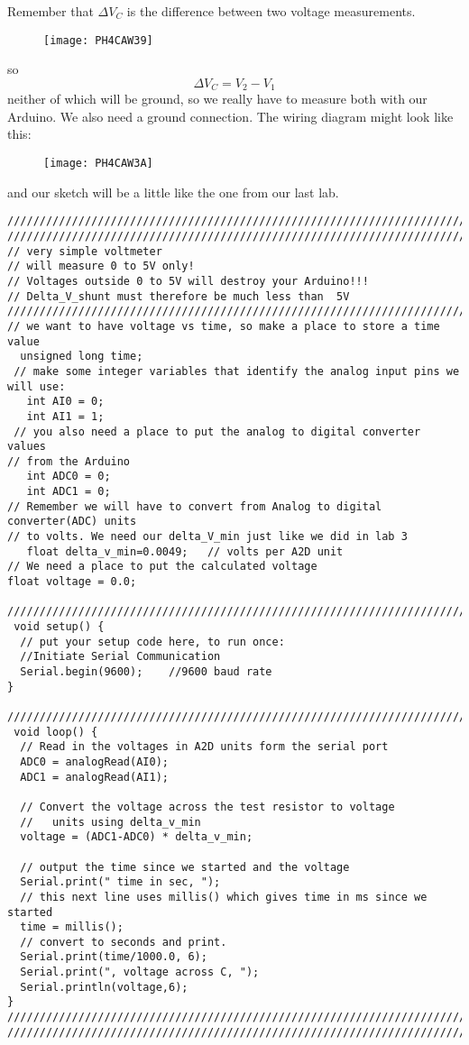 Remember that $\Delta V_{C}$ is the difference between two voltage
measurements. \begin{figure}[h!]
\texttt{[image: PH4CAW39]}
\end{figure}so 
\begin{equation*}
\Delta V_{C}=V_{2}-V_{1}
\end{equation*}%
neither of which will be ground, so we really have to measure both with our
Arduino. We also need a ground connection. The wiring diagram might look
like this:\begin{figure}[h!]
\texttt{[image: PH4CAW3A]}
\end{figure}and our sketch will be a little
like the one from our last lab.
\begin{verbatim}
////////////////////////////////////////////////////////////////////////////
////////////////////////////////////////////////////////////////////////////
// very simple voltmeter 
// will measure 0 to 5V only!
// Voltages outside 0 to 5V will destroy your Arduino!!!
// Delta_V_shunt must therefore be much less than  5V
////////////////////////////////////////////////////////////////////////////
// we want to have voltage vs time, so make a place to store a time value
  unsigned long time;
 // make some integer variables that identify the analog input pins we will use:
   int AI0 = 0;
   int AI1 = 1;
 // you also need a place to put the analog to digital converter values 
// from the Arduino
   int ADC0 = 0;
   int ADC1 = 0;
// Remember we will have to convert from Analog to digital converter(ADC) units
// to volts. We need our delta_V_min just like we did in lab 3 
   float delta_v_min=0.0049;   // volts per A2D unit
// We need a place to put the calculated voltage
float voltage = 0.0;
 
////////////////////////////////////////////////////////////////////////////
 void setup() {
  // put your setup code here, to run once:
  //Initiate Serial Communication
  Serial.begin(9600);    //9600 baud rate
}
 
////////////////////////////////////////////////////////////////////////////
 void loop() {
  // Read in the voltages in A2D units form the serial port
  ADC0 = analogRead(AI0); 
  ADC1 = analogRead(AI1);
  
  // Convert the voltage across the test resistor to voltage 
  //   units using delta_v_min
  voltage = (ADC1-ADC0) * delta_v_min;
 
  // output the time since we started and the voltage
  Serial.print(" time in sec, ");
  // this next line uses millis() which gives time in ms since we started
  time = millis();
  // convert to seconds and print.
  Serial.print(time/1000.0, 6);  
  Serial.print(", voltage across C, ");
  Serial.println(voltage,6);
}
////////////////////////////////////////////////////////////////////////////
////////////////////////////////////////////////////////////////////////////
 
\end{verbatim}


